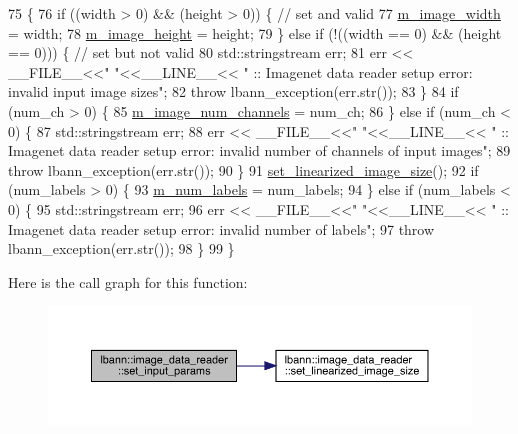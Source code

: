 \begin{DoxyCode}
75                                                                                                            
             \{
76   \textcolor{keywordflow}{if} ((width > 0) && (height > 0)) \{ \textcolor{comment}{// set and valid}
77     \hyperlink{classlbann_1_1image__data__reader_af001f3d1c0f1c580b66988233b3a64f0}{m\_image\_width} = width;
78     \hyperlink{classlbann_1_1image__data__reader_a0632efa3deaa9d61e671f741909eb3fe}{m\_image\_height} = height;
79   \} \textcolor{keywordflow}{else} \textcolor{keywordflow}{if} (!((width == 0) && (height == 0))) \{ \textcolor{comment}{// set but not valid}
80     std::stringstream err;
81     err << \_\_FILE\_\_<<\textcolor{stringliteral}{" "}<<\_\_LINE\_\_<< \textcolor{stringliteral}{" :: Imagenet data reader setup error: invalid input image sizes"};
82     \textcolor{keywordflow}{throw} lbann\_exception(err.str());
83   \}
84   \textcolor{keywordflow}{if} (num\_ch > 0) \{
85     \hyperlink{classlbann_1_1image__data__reader_aab1a440f361521dc7bd583cefe1061f8}{m\_image\_num\_channels} = num\_ch;
86   \} \textcolor{keywordflow}{else} \textcolor{keywordflow}{if} (num\_ch < 0) \{
87     std::stringstream err;
88     err << \_\_FILE\_\_<<\textcolor{stringliteral}{" "}<<\_\_LINE\_\_<< \textcolor{stringliteral}{" :: Imagenet data reader setup error: invalid number of channels of
       input images"};
89     \textcolor{keywordflow}{throw} lbann\_exception(err.str());
90   \}
91   \hyperlink{classlbann_1_1image__data__reader_a0164b0e3abbe92daef73b36fb925403e}{set\_linearized\_image\_size}();
92   \textcolor{keywordflow}{if} (num\_labels > 0) \{
93     \hyperlink{classlbann_1_1image__data__reader_af280e8758a6ec3acee7c62e6351d17e0}{m\_num\_labels} = num\_labels;
94   \} \textcolor{keywordflow}{else} \textcolor{keywordflow}{if} (num\_labels < 0) \{
95     std::stringstream err;
96     err << \_\_FILE\_\_<<\textcolor{stringliteral}{" "}<<\_\_LINE\_\_<< \textcolor{stringliteral}{" :: Imagenet data reader setup error: invalid number of labels"};
97     \textcolor{keywordflow}{throw} lbann\_exception(err.str());
98   \}
99 \}
\end{DoxyCode}
Here is the call graph for this function\+:\nopagebreak
\begin{figure}[H]
\begin{center}
\leavevmode
\includegraphics[width=350pt]{classlbann_1_1image__data__reader_a6ed9b8b12ad3ffa93ad458d872f8c044_cgraph}
\end{center}
\end{figure}
